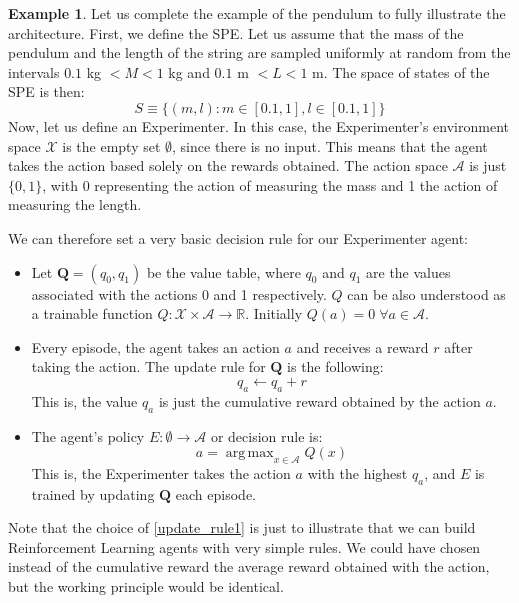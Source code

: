 \documentclass[11pt,a4paper,twoside]{report}
\DeclareMathOperator*{\argmax}{arg\,max}
\newcommand{\+}{\textnormal{+} }
\theoremstyle{definition}
\newtheorem{myex}[mythm]{Example}
\numberwithin{equation}{chapter}
\begin{document}
\begin{myex}
Let us complete the example of the pendulum to fully illustrate the architecture.
First, we define the SPE. Let us assume that the mass of the pendulum and the
length of the string are sampled uniformly at random from the intervals \break
$0.1$ kg $< M < 1$ kg and $ 0.1$ m $<L<1 $ m. The space of states of the SPE
is then:
 \begin{equation}
  S\equiv \{(m,l):m \in \left[0.1, 1\right],l \in [0.1,1]\}
 \end{equation}
Now, let us define an Experimenter. In this case, the Experimenter's environment
space $\mathcal{X}$ is the empty set $\emptyset$, since there is no input. This
means that the agent takes the action based solely on the rewards obtained. The
action space $\mathcal{A}$ is just $\{0,1\}$, with 0 representing the action of
measuring the mass and 1 the action of measuring the length.

We can therefore set a very basic decision rule for our Experimenter agent:

\begin{itemize}
  \item Let $\textbf{Q}=(q_0,q_1)$ be the value table, where $q_0$ and $q_1$ are
  the values associated with the actions 0 and 1 respectively.  $Q$ can be also
  understood as a trainable function $Q:\mathcal{X}\times\mathcal{A} \rightarrow
  \mathbb{R}$. Initially $Q(a)=0 \; \forall a \in \mathcal{A}$. 
  \item  Every episode, the agent takes an action $a$ and receives a reward $r$
  after taking the action.
  The update rule for $\textbf{Q}$ is the following:
  \begin{equation}
    q_a\leftarrow q_a + r
    \label{update_rule1}
  \end{equation}
  This is, the value $q_a$ is just the cumulative reward obtained by the 
  action $a$. 
  \item The agent's policy $E:\emptyset  \rightarrow \mathcal{A}$ or 
  decision rule is:
  \begin{equation}
    a = \argmax_{x \in \mathcal{A}} Q(x)
    \label{argmax_policy}
  \end{equation}
  This is, the Experimenter takes the action $a$ with the highest $q_a$, and 
  $E$ is trained by updating $\textbf{Q}$ each episode.
\end{itemize}

Note that the choice of \eqref{update_rule1} is just to illustrate that we can
build Reinforcement Learning agents with very simple rules. We could have
chosen instead of the cumulative reward the average reward obtained with the 
action, but the working principle would be identical.


\end{myex}
\end{document}

